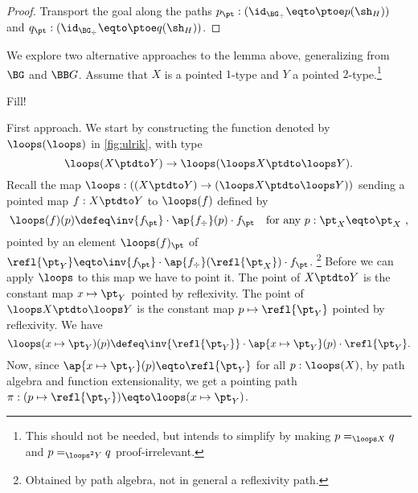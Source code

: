 {\begin{proof}
Transport the goal along the paths
$p_\pt: (\id_{\BG_\div}\eqto\ptoe p(\sh_H))$ and
$q_\pt: (\id_{\BG_\div}\eqto\ptoe q(\sh_H))$.


\end{proof}


\begin{remark}\label{rem:grpHomOK}
We explore two alternative approaches to the lemma above,
generalizing from $\BG$ and $\BB G$.
Assume that $X$ is a pointed $1$-type and $Y$ a
pointed $2$-type.\footnote{This should not be needed, but intends to
simplify by making $p=_{\loops X}q$ and $p=_{{\loops}^2 Y}q$
proof-irrelevant.}
\begin{marginfigure}
  \caption{\label{fig:ulrik}
  Fill!} 
\end{marginfigure}

First approach. We start by constructing the function 
denoted by ${\loops(\loops)}$ in \cref{fig:ulrik}, with type 
$$\loops(X\ptdto Y) \to \loops(\loops X\ptdto \loops Y).$$
Recall the map $\loops : ((X\ptdto Y)\to(\loops X\ptdto \loops Y))$
sending  a pointed map $f:X\ptdto Y$ to $\loops(f)$ defined by 
\[
\loops(f)(p) \defeq \inv{f_\pt}\cdot \ap{f_\div}(p) \cdot f_\pt
\quad\text{for any $p:\pt_X\eqto\pt_X $,}
\]
pointed by an element $\loops(f)_\pt$ of 
$\refl{\pt_Y} \eqto \inv{f_\pt}\cdot \ap{f_\div}(\refl{\pt_X}) \cdot f_\pt$.%
\footnote{
Obtained by path algebra, not in general a reflexivity path.}
Before we can apply ${\loops}$ to this map we have to point it.
The point of $X\ptdto Y$ is the constant 
map $x\mapsto\pt_Y$ pointed by reflexivity.
The point of $\loops X\ptdto \loops Y$ is the constant 
map $p\mapsto\refl{\pt_Y}$ pointed by reflexivity.
We have
\[
\loops(x\mapsto\pt_Y)(p) \defeq 
\inv{\refl{\pt_Y}}\cdot \ap{x\mapsto\pt_Y}(p) \cdot \refl{\pt_Y}.
\]
Now, since $\ap{x\mapsto\pt_Y}(p) \eqto \refl{\pt_Y}$ 
for all $p: \loops(X)$, by path algebra and function extensionality, 
we get a pointing path
$\pi: (p\mapsto \refl{\pt_Y})\eqto \loops(x\mapsto\pt_Y)$.


\end{remark}}
